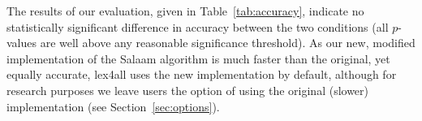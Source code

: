 \documentclass[11pt]{article}
\begin{document}
The results of our evaluation, given in Table~\ref{tab:accuracy}, indicate no statistically significant difference in accuracy between the two conditions (all $p$-values are well above any reasonable significance threshold).  
As our new, modified implementation of the Salaam algorithm 
is much faster than the original, yet equally accurate,
lex4all uses the new implementation by default, although for research purposes we leave users the option of using the original (slower) implementation (see Section~\ref{sec:options}).



%
%
\end{document}
